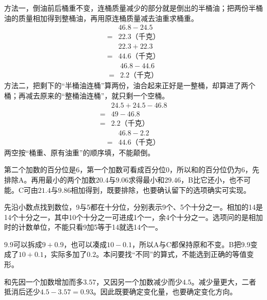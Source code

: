 \documentclass[multi=snippet,border=0pt]{standalone}
\newenvironment{snippet}[3]{\begin{minipage}{#1bp}\color{answerred}\fontsize{#2}{#3}\selectfont\raggedright}{\end{minipage}}
\begin{document}
\begin{snippet}{505}{11.5}{14}方法一，倒油前后桶重不变，连桶质量减少的部分就是倒出的半桶油；把两份半桶油的质量相加得到整桶油，再用原连桶质量减去油重求桶重。\[\begin{aligned}&46.8-24.5\\={}&22.3\text{（千克）}\end{aligned}\]\[\begin{aligned}&22.3+22.3\\={}&44.6\text{（千克）}\end{aligned}\]\[\begin{aligned}&46.8-44.6\\={}&2.2\text{（千克）}\end{aligned}\]方法二，把剩下的“半桶油连桶”算两份，油合起来正好是一整桶，却算进了两个桶；再减去原来的“整桶油连桶”，就只剩一个空桶。\[\begin{aligned}&24.5+24.5-46.8\\={}&49-46.8\\={}&2.2\text{（千克）}\end{aligned}\]\[\begin{aligned}&46.8-2.2\\={}&44.6\text{（千克）}\end{aligned}\]两空按“桶重、原有油重”的顺序填，不能颠倒。\end{snippet}
\begin{snippet}{505}{11.5}{14}第二个加数的百分位是6，第一个加数可看成百分位0，所以和的百分位仍为6，先排除A。再用最小的两个加数\(20.4\)与\(9.06\)求得最小和\(29.46\)，B比它还小，也不可能。C可由\(21.4\)与\(9.86\)相加得到，既要排除，也要确认留下的选项确实可实现。\end{snippet}
\begin{snippet}{505}{11.5}{14}先沿小数点找到数位，9与5都在十分位，分别表示9个、5个十分之一。相加的14是14个十分之一，其中10个十分之一可进成1个一，余4个十分之一。选项问的是相加时的计数单位，不能只看9加5等于14就选14个一。\end{snippet}
\begin{snippet}{505}{11.5}{14}\(9.9\)可以拆成\(9+0.9\)，也可以凑成\(10-0.1\)，所以A与C都保持原和不变。B把9.9变成了\(10+0.1\)，实际多加了\(0.2\)。本问要找“不同”的算式，不能选到正确的等值变形。\end{snippet}
\begin{snippet}{505}{11.5}{14}和先因一个加数增加而多\(3.57\)，又因另一个加数减少而少\(4.5\)。减少量更大，二者抵消后还少\(4.5-3.57=0.93\)。因此既要确定变化量，也要确定变化方向。\end{snippet}
\end{document}
